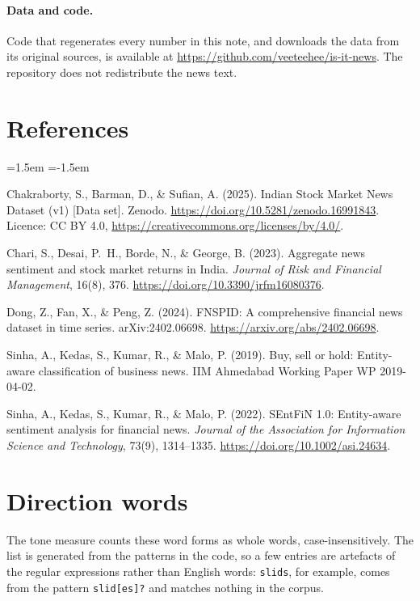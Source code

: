 \documentclass[11pt]{article}
\newcommand{\repourl}{\url{https://github.com/veeteehee/is-it-news}}
\begin{document}
\paragraph{Data and code.} Code that regenerates every number in this note, and downloads the data from its original sources, is available at \repourl{}. The repository does not redistribute the news text.

\section*{References}

\begin{list}{}{\leftmargin=1.5em \itemindent=-1.5em \itemsep=4pt}
\item Chakraborty, S., Barman, D., \& Sufian, A. (2025). Indian Stock Market News Dataset (v1) [Data set]. Zenodo. \url{https://doi.org/10.5281/zenodo.16991843}. Licence: CC BY 4.0, \url{https://creativecommons.org/licenses/by/4.0/}.
\item Chari, S., Desai, P.\ H., Borde, N., \& George, B. (2023). Aggregate news sentiment and stock market returns in India. \emph{Journal of Risk and Financial Management}, 16(8), 376. \url{https://doi.org/10.3390/jrfm16080376}.
\item Dong, Z., Fan, X., \& Peng, Z. (2024). FNSPID: A comprehensive financial news dataset in time series. arXiv:2402.06698. \url{https://arxiv.org/abs/2402.06698}.
\item Sinha, A., Kedas, S., Kumar, R., \& Malo, P. (2019). Buy, sell or hold: Entity-aware classification of business news. IIM Ahmedabad Working Paper WP 2019-04-02.
\item Sinha, A., Kedas, S., Kumar, R., \& Malo, P. (2022). SEntFiN 1.0: Entity-aware sentiment analysis for financial news. \emph{Journal of the Association for Information Science and Technology}, 73(9), 1314--1335. \url{https://doi.org/10.1002/asi.24634}.
\end{list}

\appendix
\section{Direction words}
\label{app:words}

The tone measure counts these word forms as whole words, case-insensitively. The list is generated from the patterns in the code, so a few entries are artefacts of the regular expressions rather than English words: \texttt{slids}, for example, comes from the pattern \texttt{slid[es]?} and matches nothing in the corpus.

\medskip

\end{document}
